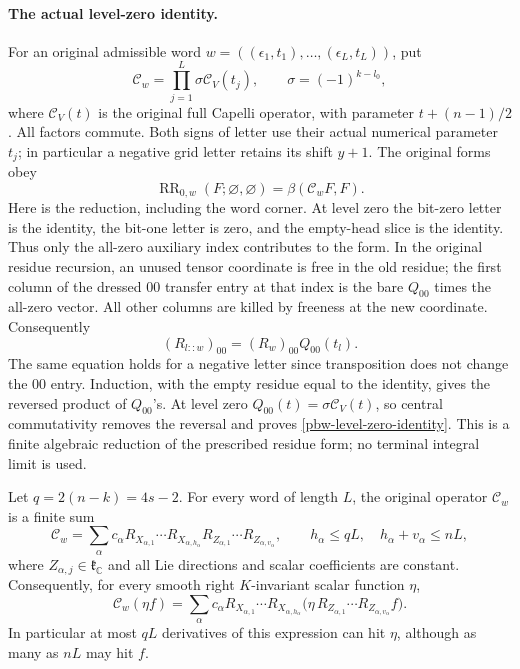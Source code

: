\paragraph{The actual level-zero identity.}
For an original admissible word $w=((\epsilon_1,t_1),\ldots,
(\epsilon_L,t_L))$, put
\[
 \mathcal C_w=\prod_{j=1}^L\sigma\mathcal C_V(t_j),
 \qquad \sigma=(-1)^{k-l_0},
\]
where $\mathcal C_V(t)$ is the original full Capelli operator,
with parameter $t+(n-1)/2$.  All factors commute.  Both signs of
letter use their actual numerical parameter $t_j$; in particular a
negative grid letter retains its shift $y+1$.  The original forms
obey
\begin{equation}\label{pbw-level-zero-identity}
 \operatorname{RR}_{0,w}(F;\varnothing,\varnothing)
                    =\beta(\mathcal C_wF,F).
\end{equation}
Here is the reduction, including the word corner.  At level zero
the bit-zero letter is the identity, the bit-one letter is zero,
and the empty-head slice is the identity.  Thus only the all-zero
auxiliary index contributes to the form.  In the original residue
recursion, an unused tensor coordinate is free in the old residue;
the first column of the dressed $00$ transfer entry at that index
is the bare $Q_{00}$ times the all-zero vector.  All other columns
are killed by freeness at the new coordinate.  Consequently
\[
 (R_{l::w})_{00}=(R_w)_{00}Q_{00}(t_l).
\]
The same equation holds for a negative letter since transposition
does not change the $00$ entry.  Induction, with the empty residue
equal to the identity, gives the reversed product of $Q_{00}$'s.
At level zero $Q_{00}(t)=\sigma\mathcal C_V(t)$, so central
commutativity removes the reversal and proves
\eqref{pbw-level-zero-identity}.  This is a finite algebraic
reduction of the prescribed residue form; no terminal integral
limit is used.

\begin{lemma}
\label{pbw-relative-order}
Let $q=2(n-k)=4s-2$.  For every word of length $L$, the original
operator $\mathcal C_w$ is a finite sum
\begin{equation}\label{pbw-reduced-word}
 \mathcal C_w=\sum_\alpha c_\alpha
 R_{X_{\alpha,1}}\cdots R_{X_{\alpha,h_\alpha}}
 R_{Z_{\alpha,1}}\cdots R_{Z_{\alpha,v_\alpha}},
 \qquad h_\alpha\le qL,\quad h_\alpha+v_\alpha\le nL,
\end{equation}
where $Z_{\alpha,j}\in\mathfrak k_{\mathbb C}$ and all Lie
directions and scalar coefficients are constant.  Consequently,
for every smooth right $K$-invariant scalar function $\eta$,
\[
 \mathcal C_w(\eta f)=\sum_\alpha c_\alpha
 R_{X_{\alpha,1}}\cdots R_{X_{\alpha,h_\alpha}}
 \bigl(\eta\,R_{Z_{\alpha,1}}\cdots
                      R_{Z_{\alpha,v_\alpha}}f\bigr).
\]
In particular at most $qL$ derivatives of this expression can hit
$\eta$, although as many as $nL$ may hit $f$.
\end{lemma}

